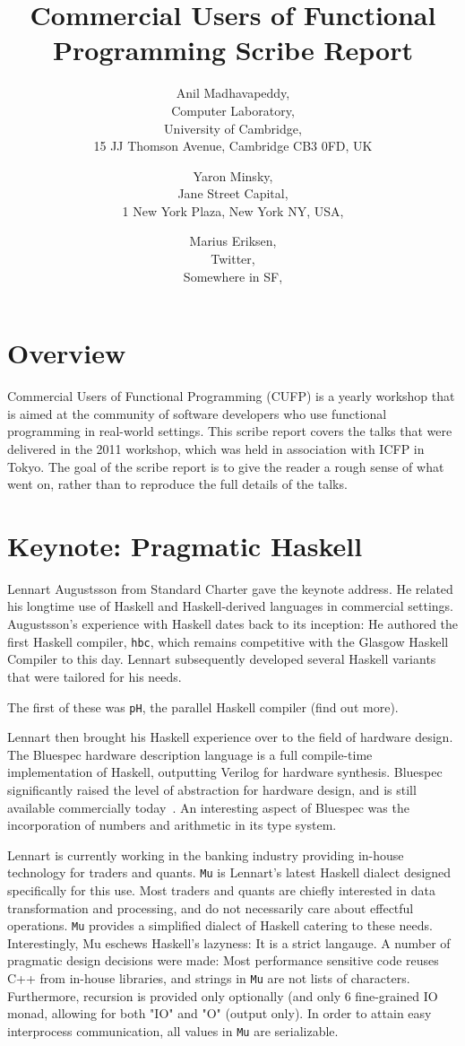 \documentclass{jfp1}
\title[Commercial Users of Functional Programming 2011]
      {Commercial Users of Functional Programming Scribe Report}
\author[Anil Madhavapeddy]
       {Anil Madhavapeddy,\\
        Computer Laboratory,\\
        University of Cambridge,\\ 
        15 JJ Thomson Avenue, Cambridge CB3 0FD, UK\\
        \email{avsm2@cl.cam.ac.uk}}
\author[Yaron Minsky]
       {Yaron Minsky,\\
        Jane Street Capital, \\
        1 New York Plaza, New York NY, USA,\\ 
        \email{yminsky@janestreet.com}}
\author[Marius Eriksen]
       {Marius Eriksen,\\
        Twitter,\\
        Somewhere in SF,\\ 
        \email{marius@twitter.com}}
\begin{document}
\label{firstpage}
\maketitle

\section{Overview}

Commercial Users of Functional Programming (CUFP) is a yearly workshop
that is aimed at the community of software developers who use functional
programming in real-world settings.  This scribe report covers the talks
that were delivered in the 2011 workshop, which was held in association
with ICFP in Tokyo.  The goal of the scribe report is to give the reader
a rough sense of what went on, rather than to reproduce the full details
of the talks.

\section{Keynote: Pragmatic Haskell}

Lennart Augustsson from Standard Charter gave the keynote address. He
related his longtime use of Haskell and Haskell-derived languages in
commercial settings.  Augustsson's experience with Haskell dates back to
its inception: He authored the first Haskell compiler, {\tt hbc}, which
remains competitive with the Glasgow Haskell Compiler to this
day. Lennart subsequently developed several Haskell variants that were
tailored for his needs.

The first of these was {\tt pH}, the parallel Haskell compiler (find out
more).

Lennart then brought his Haskell experience over to the field of
hardware design.  The Bluespec hardware description language is a full
compile-time implementation of Haskell, outputting Verilog for hardware
synthesis.  Bluespec significantly raised the level of abstraction for
hardware design, and is still available commercially
today~\cite{bluespec}.  An interesting aspect of Bluespec was the
incorporation of numbers and arithmetic in its type system.

Lennart is currently working in the banking industry providing in-house
technology for traders and quants.  {\tt Mu} is Lennart's latest Haskell
dialect designed specifically for this use.  Most traders and quants are
chiefly interested in data transformation and processing, and do not
necessarily care about effectful operations.  {\tt Mu} provides a
simplified dialect of Haskell catering to these needs.  Interestingly,
Mu eschews Haskell's lazyness: It is a strict langauge.  A number of
pragmatic design decisions were made: Most performance sensitive code
reuses C++ from in-house libraries, and strings in {\tt Mu} are not
lists of characters.  Furthermore, recursion is provided only optionally
(and only 6%
fine-grained IO monad, allowing for both "IO" and "O" (output only).  In
order to attain easy interprocess communication, all values in {\tt Mu}
are serializable.
\end{document}
